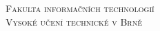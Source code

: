\documentclass[11pt,titlepage]{article} %
\title{}
\author{}
\date{\today}
\begin{document}
\begin{titlepage} %
  \makeatletter
  \begin{center}
    \LARGE
    \textsc{Fakulta informačních technologií \\ Vysoké učení technické v Brně}

    \Huge
    \@title

  \end{center}

  \large
  \@date \hfill \@author
  \makeatother
\end{titlepage}
\newpage %

\tableofcontents
\newpage

\end{document}
